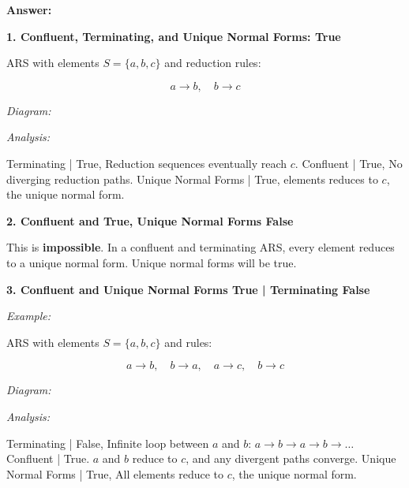 \documentclass{article}
\theoremstyle{theorem}
\theoremstyle{definition}
\theoremstyle{remark}
\begin{document}
{  \textbf{Answer:}

  \textbf{1. Confluent, Terminating, and Unique Normal Forms: True}

  ARS with elements \( S = \{ a, b, c \} \) and reduction rules:

  \[
    a \to b, \quad b \to c
  \]

  \textit{Diagram:}

  \begin{center}
  \end{center}

  \textit{Analysis:}

Terminating | True, Reduction sequences eventually reach \( c \).
Confluent | True, No diverging reduction paths.
Unique Normal Forms | True, elements reduces to \( c \), the unique normal form.


  \textbf{2. Confluent and True, Unique Normal Forms False}

  This is \textbf{impossible}. In a confluent and terminating ARS, every element reduces to a unique normal form. Unique normal forms will be true.


  \textbf{3. Confluent and Unique Normal Forms True | Terminating False}

  \textit{Example:}

ARS with elements \( S = \{ a, b, c \} \) and rules:

  \[
    a \to b, \quad b \to a, \quad a \to c, \quad b \to c
  \]

  \textit{Diagram:}

  \begin{center}
  \end{center}

  \textit{Analysis:}

Terminating | False, Infinite loop between \( a \) and \( b \): \( a \to b \to a \to b \to \dots \)
Confluent | True. \( a \) and \( b \) reduce to \( c \), and any divergent paths converge.
Unique Normal Forms | True, All elements reduce to \( c \), the unique normal form.

}
\end{document}
